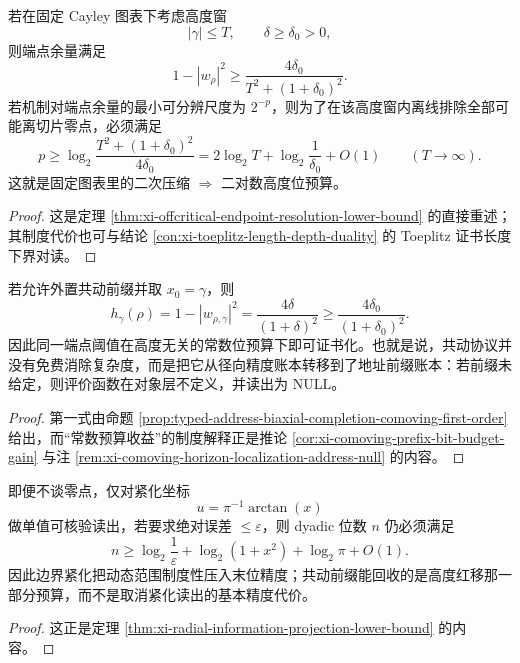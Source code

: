 \begin{proposition}[固定图表的最坏位预算]\label{prop:typed-address-biaxial-completion-comoving-bit-budget}
若在固定 Cayley 图表下考虑高度窗
\[
|\gamma|\le T,
\qquad
\delta\ge \delta_0>0,
\]
则端点余量满足
\[
1-|w_\rho|^2\ge \frac{4\delta_0}{T^2+(1+\delta_0)^2}.
\]
若机制对端点余量的最小可分辨尺度为 \(2^{-p}\)，则为了在该高度窗内离线排除全部可能离切片零点，必须满足
\[
p\ge
\log_2\!\frac{T^2+(1+\delta_0)^2}{4\delta_0}
=
2\log_2 T+\log_2\frac1{\delta_0}+O(1)
\qquad(T\to\infty).
\]
这就是固定图表里的二次压缩 \(\Rightarrow\) 二对数高度位预算。
\end{proposition}
\begin{proof}
这是定理 \ref{thm:xi-offcritical-endpoint-resolution-lower-bound} 的直接重述；其制度代价也可与结论 \ref{con:xi-toeplitz-length-depth-duality} 的 Toeplitz 证书长度下界对读。
\end{proof}

\begin{corollary}[共动前缀的常数预算收益]\label{cor:typed-address-biaxial-completion-comoving-prefix-gain}
若允许外置共动前缀并取 \(x_0=\gamma\)，则
\[
h_\gamma(\rho)=1-|w_{\rho,\gamma}|^2=\frac{4\delta}{(1+\delta)^2}\ge \frac{4\delta_0}{(1+\delta_0)^2}.
\]
因此同一端点阈值在高度无关的常数位预算下即可证书化。也就是说，共动协议并没有免费消除复杂度，而是把它从径向精度账本转移到了地址前缀账本：若前缀未给定，则评价函数在对象层不定义，并读出为 \(\mathrm{NULL}\)。
\end{corollary}
\begin{proof}
第一式由命题 \ref{prop:typed-address-biaxial-completion-comoving-first-order} 给出，而“常数预算收益”的制度解释正是推论 \ref{cor:xi-comoving-prefix-bit-budget-gain} 与注 \ref{rem:xi-comoving-horizon-localization-address-null} 的内容。
\end{proof}

\begin{proposition}[紧化读出的径向位复杂度下界]\label{prop:typed-address-biaxial-completion-comoving-radial-bits}
即便不谈零点，仅对紧化坐标
\[
u=\pi^{-1}\arctan(x)
\]
做单值可核验读出，若要求绝对误差 \(\le \varepsilon\)，则 dyadic 位数 \(n\) 仍必须满足
\[
n\ge \log_2\!\frac1\varepsilon + \log_2(1+x^2)+\log_2\pi + O(1).
\]
因此边界紧化把动态范围制度性压入末位精度；共动前缀能回收的是高度红移那一部分预算，而不是取消紧化读出的基本精度代价。
\end{proposition}
\begin{proof}
这正是定理 \ref{thm:xi-radial-information-projection-lower-bound} 的内容。
\end{proof}

